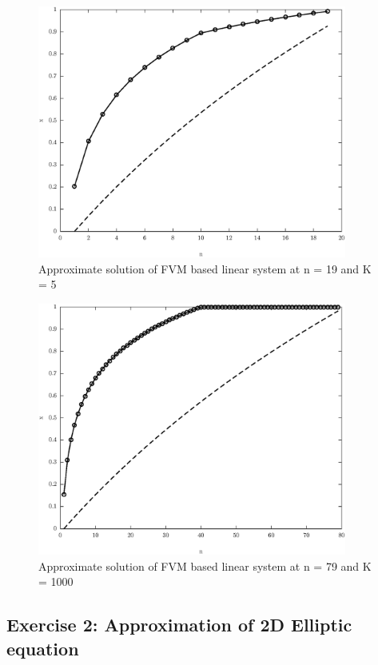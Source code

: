 \documentclass[11pt]{article}
\begin{document}
\begin{figure}[!hbt]
\begin{center}
	\includegraphics[width=4in]{math609_pa1_comp_example_1_n_19_k_2.eps}
	\caption{Approximate solution of FVM based linear system at n = 19 and K = 5}
\end{center}
\end{figure}

\begin{figure}[!hbt]
\begin{center}
	\includegraphics[width=4in]{math609_pa1_comp_example_1_n_79_k_1000.eps}
	\caption{Approximate solution of FVM based linear system at n = 79 and K = 1000}
\end{center}
\end{figure}

\subsection{Exercise 2: Approximation of 2D Elliptic equation}
\end{document}
